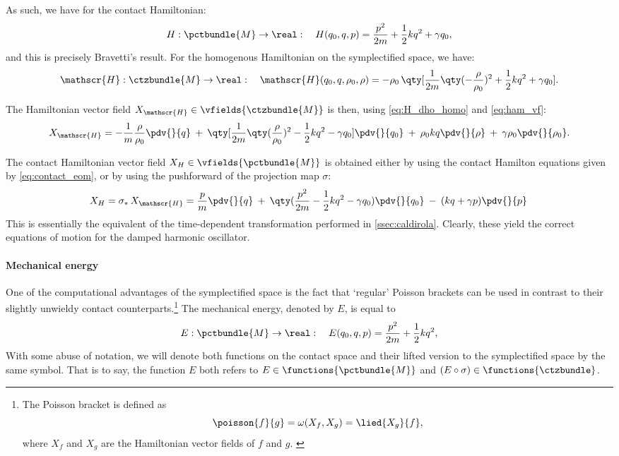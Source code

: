 As such, we have for the contact Hamiltonian:
\begin{equation}
    H: \pctbundle{M} \to \real: \quad H(q_0, q, p) = \frac{p^2}{2m} + \frac{1}{2}kq^2 + \gamma q_0,
    \label{eq:H_dho}
\end{equation}
and this is precisely Bravetti's result. For the homogenous Hamiltonian on the symplectified space, we have:
\begin{equation}
    \mathscr{H}: \ctzbundle{M} \to \real: \quad \mathscr{H}(q_0, q, \rho_0, \rho) = -\rho_0\,\qty[\frac{1}{2m}\qty(-\frac{\rho}{\rho_0})^2 + \frac{1}{2}kq^2 + \gamma q_0]. 
    \label{eq:H_dho_homo}
\end{equation}

The Hamiltonian vector field $X_\mathscr{H} \in \vfields{\ctzbundle{M}}$ is then, using \cref{eq:H_dho_homo} and \cref{eq:ham_vf}:
$$ X_{\mathscr{H}} = -\frac{1}{m}\frac{\rho}{\rho_0}\pdv{}{q}\: + \: \qty[\frac{1}{2m}\qty(\frac{\rho}{\rho_0})^2 - \frac{1}{2}kq^2 - \gamma q_0]\pdv{}{q_0}\: + \: \rho_0 kq \pdv{}{\rho}\: + \: \gamma \rho_0 \pdv{}{\rho_0}.$$ 

The contact Hamiltonian vector field $X_H \in \vfields{\pctbundle{M}}$ is obtained either by using the contact Hamilton equations given by \cref{eq:contact_eom}, or by using the pushforward of the projection map $\sigma$:
$$ X_H = \sigma_*\,X_\mathscr{H} = \frac{p}{m}\pdv{}{q}\: + \: \qty(\frac{p^2}{2m} - \frac{1}{2}kq^2 - \gamma q_0)\pdv{}{q_0}\: - \: (kq + \gamma p)\pdv{}{p}\: $$
This is essentially the equivalent of the time-dependent transformation performed in \cref{ssec:caldirola}. Clearly, these yield the correct equations of motion for the damped harmonic oscillator.

\paragraph{Mechanical energy} One of the computational advantages of the symplectified space is the fact that `regular' Poisson brackets can be used in contrast to their slightly unwieldy contact counterparts.\footnote
{The Poisson bracket is defined as 
    $$ \poisson{f}{g} = \omega(X_f, X_g) = \lied{X_g}{f},$$
 where $X_f$ and $X_g$ are the Hamiltonian vector fields of $f$ and $g$. \cite{Libermann1987}
} 
The mechanical energy, denoted by $E$, is equal to 
$$ E: \pctbundle{M} \to \real: \quad E(q_0, q, p) = \frac{p^2}{2m} + \frac{1}{2}kq^2,$$
With some abuse of notation, we will denote both functions on the contact space and their lifted version to the symplectified space by the same symbol. That is to say, the function $E$ both refers to $E \in \functions{\pctbundle{M}}$ and $(E \circ \sigma) \in \functions{\ctzbundle}$.

